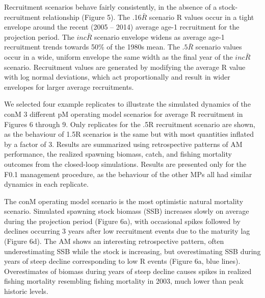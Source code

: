 \documentclass[12pt,]{article}
\begin{document}
Recruitment scenarios behave fairly consistently, in the absence of a
stock-recruitment relationship (Figure 5). The .16\(\bar{R}\) scenario R
values occur in a tight envelope around the recent (2005 -- 2014)
average age-1 recruitment for the projection period. The \(inc\bar{R}\)
scenario envelope widens as average age-1 recruitment trends towards
50\% of the 1980s mean. The \(.5\bar{R}\) scenario values occur in a
wide, uniform envelope the same width as the final year of the
\(inc\bar{R}\) scenario. Recruitment values are generated by modifying
the average R value with log normal deviations, which act proportionally
and result in wider envelopes for larger average recruitments.

We selected four example replicates to illustrate the simulated dynamics
of the conM 3 different pM operating model scenarios for average R
recruitment in Figures 6 through 9. Only replicates for the .5R
recruitment scenario are shown, as the behaviour of 1.5R scenarios is
the same but with most quantities inflated by a factor of 3. Results are
summarized using retrospective patterns of AM performance, the realized
spawning biomass, catch, and fishing mortality outcomes from the
closed-loop simulations. Results are presented only for the F0.1
management procedure, as the behaviour of the other MPs all had similar
dynamics in each replicate.

The conM operating model scenario is the most optimistic natural
mortality scenario. Simulated spawning stock biomass (SSB) increases
slowly on average during the projection period (Figure 6a), with
occasional spikes followed by declines occurring 3 years after low
recruitment events due to the maturity lag (Figure 6d). The AM shows an
interesting retrospective pattern, often underestimating SSB while the
stock is increasing, but overestimating SSB during years of steep
decline corresponding to low R events (Figure 6a, blue lines).
Overestimates of biomass during years of steep decline causes spikes in
realized fishing mortality resembling fishing mortality in 2003, much
lower than peak historic levels.
\end{document}
